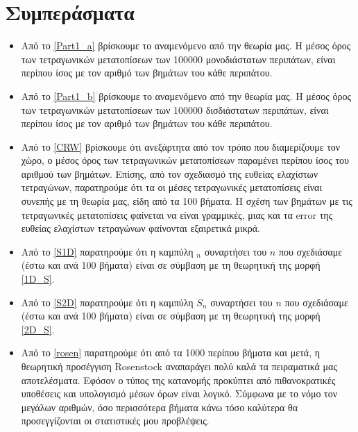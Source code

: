 \chapter{Συμπεράσματα}
\begin{itemize}
\item Από το \ref{Part1_a} βρίσκουμε το αναμενόμενο από την θεωρία μας. Η μέσος όρος των τετραγωνικών μετατοπίσεων των 100000 μονοδιάστατων περιπάτων, είναι περίπου ίσος με τον αριθμό των βημάτων του κάθε περιπάτου.
\item Από το \ref{Part1_b} βρίσκουμε το αναμενόμενο από την θεωρία μας. Η μέσος όρος των τετραγωνικών μετατοπίσεων των 100000 δισδιάστατων περιπάτων, είναι περίπου ίσος με τον αριθμό των βημάτων του κάθε περιπάτου.
\item Από το \ref{CRW} βρίσκουμε ότι ανεξάρτητα από τον τρόπο που διαμερίζουμε τον χώρο, ο μέσος όρος των τετραγωνικών μετατοπίσεων παραμένει περίπου ίσος του αριθμού των βημάτων. Επίσης, από τον σχεδιασμό της ευθείας ελαχίστων τετραγώνων, παρατηρούμε ότι τα οι μέσες τετραγωνικές μετατοπίσεις είναι συνεπής με τη θεωρία μας, είδη από τα 100 βήματα. Η σχέση των βημάτων με τις τετραγωνικές μετατοπίσεις φαίνεται να είναι γραμμικές, μιας και τα {\en error} της ευθείας ελαχίστων τετραγώνων φαίνονται εξαιρετικά μικρά. 
\item
Από το \ref{S1D} παρατηρούμε ότι η καμπύλη $_n$ συναρτήσει του $n$ που σχεδιάσαμε (έστω και ανά 100 βήματα) είναι σε σύμβαση με τη θεωρητική της μορφή \eqref{1D_S}.
\item
Από το \ref{S2D} παρατηρούμε ότι η καμπύλη $S_n$ συναρτήσει του $n$ που σχεδιάσαμε (έστω και ανά 100 βήματα) είναι σε σύμβαση με τη θεωρητική της μορφή \eqref{2D_S}.
\item Από το \ref{rosen} παρατηρούμε ότι από τα 1000 περίπου βήματα και μετά, η θεωρητική προσέγγιση {\en Rosenstock} αναπαράγει πολύ καλά τα πειραματικά μας αποτελέσματα. Εφόσον ο τύπος της κατανομής προκύπτει από πιθανοκρατικές υποθέσεις και υπολογισμό μέσων όρων είναι λογικό. Σύμφωνα με το νόμο τον μεγάλων αριθμών, όσο περισσότερα βήματα κάνω τόσο καλύτερα θα προσεγγίζονται οι στατιστικές μου προβλέψεις.
\end{itemize}